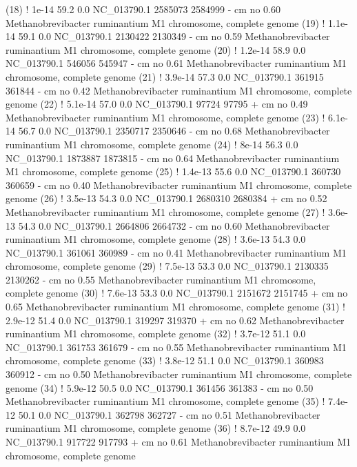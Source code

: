 \begin{sreoutput}
 (18) !     1e-14   59.2   0.0  NC_013790.1 2585073 2584999 -  cm    no 0.60  Methanobrevibacter ruminantium M1 chromosome, complete genome
 (19) !   1.1e-14   59.1   0.0  NC_013790.1 2130422 2130349 -  cm    no 0.59  Methanobrevibacter ruminantium M1 chromosome, complete genome
 (20) !   1.2e-14   58.9   0.0  NC_013790.1  546056  545947 -  cm    no 0.61  Methanobrevibacter ruminantium M1 chromosome, complete genome
 (21) !   3.9e-14   57.3   0.0  NC_013790.1  361915  361844 -  cm    no 0.42  Methanobrevibacter ruminantium M1 chromosome, complete genome
 (22) !   5.1e-14   57.0   0.0  NC_013790.1   97724   97795 +  cm    no 0.49  Methanobrevibacter ruminantium M1 chromosome, complete genome
 (23) !   6.1e-14   56.7   0.0  NC_013790.1 2350717 2350646 -  cm    no 0.68  Methanobrevibacter ruminantium M1 chromosome, complete genome
 (24) !     8e-14   56.3   0.0  NC_013790.1 1873887 1873815 -  cm    no 0.64  Methanobrevibacter ruminantium M1 chromosome, complete genome
 (25) !   1.4e-13   55.6   0.0  NC_013790.1  360730  360659 -  cm    no 0.40  Methanobrevibacter ruminantium M1 chromosome, complete genome
 (26) !   3.5e-13   54.3   0.0  NC_013790.1 2680310 2680384 +  cm    no 0.52  Methanobrevibacter ruminantium M1 chromosome, complete genome
 (27) !   3.6e-13   54.3   0.0  NC_013790.1 2664806 2664732 -  cm    no 0.60  Methanobrevibacter ruminantium M1 chromosome, complete genome
 (28) !   3.6e-13   54.3   0.0  NC_013790.1  361061  360989 -  cm    no 0.41  Methanobrevibacter ruminantium M1 chromosome, complete genome
 (29) !   7.5e-13   53.3   0.0  NC_013790.1 2130335 2130262 -  cm    no 0.55  Methanobrevibacter ruminantium M1 chromosome, complete genome
 (30) !   7.6e-13   53.3   0.0  NC_013790.1 2151672 2151745 +  cm    no 0.65  Methanobrevibacter ruminantium M1 chromosome, complete genome
 (31) !   2.9e-12   51.4   0.0  NC_013790.1  319297  319370 +  cm    no 0.62  Methanobrevibacter ruminantium M1 chromosome, complete genome
 (32) !   3.7e-12   51.1   0.0  NC_013790.1  361753  361679 -  cm    no 0.55  Methanobrevibacter ruminantium M1 chromosome, complete genome
 (33) !   3.8e-12   51.1   0.0  NC_013790.1  360983  360912 -  cm    no 0.50  Methanobrevibacter ruminantium M1 chromosome, complete genome
 (34) !   5.9e-12   50.5   0.0  NC_013790.1  361456  361383 -  cm    no 0.50  Methanobrevibacter ruminantium M1 chromosome, complete genome
 (35) !   7.4e-12   50.1   0.0  NC_013790.1  362798  362727 -  cm    no 0.51  Methanobrevibacter ruminantium M1 chromosome, complete genome
 (36) !   8.7e-12   49.9   0.0  NC_013790.1  917722  917793 +  cm    no 0.61  Methanobrevibacter ruminantium M1 chromosome, complete genome

\end{sreoutput}
